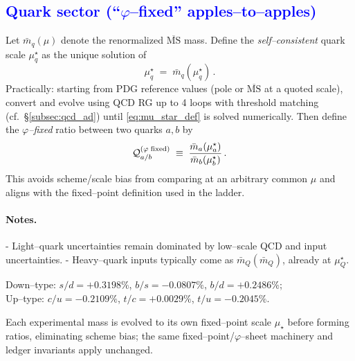 \documentclass[%
 amsmath,amssymb,
 aps,
prb,
floatfix, showkeys
]{revtex4-2}
\newcommand{\modif}[1]{\textcolor{blue}{#1}}
\begin{document}
{\modif{
    \subsection{Quark sector (``$\varphi$--fixed'' apples--to--apples)}
}}
Let $\bar m_q(\mu)$ denote the renormalized $\overline{\mathrm{MS}}$ mass.
Define the \emph{self--consistent} quark scale $\mu^\star_q$ as the unique solution of
\begin{equation}
  \mu^\star_q \;=\; \bar m_q(\mu^\star_q)\,.
  \label{eq:mu_star_def}
\end{equation}
Practically: starting from PDG reference values (pole or $\overline{\mathrm{MS}}$ at a quoted scale), convert and evolve using QCD RG up to 4 loops with threshold matching (cf.\ \S\ref{subsec:qcd_ad}) until \eqref{eq:mu_star_def} is solved numerically. Then define the \emph{$\varphi$--fixed} ratio between two quarks $a,b$ by
\begin{equation}
  \mathcal{Q}_{a/b}^{(\varphi{\rm\;fixed})}
  \;\equiv\; \frac{\bar m_a(\mu^\star_a)}{\bar m_b(\mu^\star_b)}\,.
  \label{eq:phi_fixed_ratio}
\end{equation}
This avoids scheme/scale bias from comparing at an arbitrary common $\mu$ and aligns with the fixed--point definition used in the ladder.

\paragraph{Notes.}
- Light--quark uncertainties remain dominated by low--scale QCD and input uncertainties.
- Heavy--quark inputs typically come as $\bar m_Q(\bar m_Q)$, already at $\mu^\star_Q$.


Down--type:
$s/d=+0.3198\%$, $b/s=-0.0807\%$, $b/d=+0.2486\%$;\\
Up--type:
$c/u=-0.2109\%$, $t/c=+0.0029\%$, $t/u=-0.2045\%$.
\medskip

Each experimental mass is evolved to its own fixed--point scale $\mu_\star$ before forming ratios, eliminating scheme bias; the same fixed–point/$\varphi$–sheet machinery and ledger invariants apply unchanged.
\end{document}
